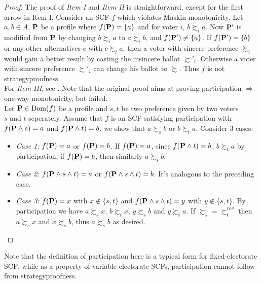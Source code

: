\begin{proof}
    The proof of \textit{Item I} and \textit{Item II} is straightforward, except for the first arrow in Item I. Consider an SCF $f$ which violates Maskin monotonicity. Let $a, b \in A$, $\mathbf{P}$ be a profile where $f(\mathbf{P}) = \{a\}$ and for voter $i$, $b \succsim_i a$. Now $\mathbf{P}'$ is modified from $\mathbf{P}$ by changing $b \succsim_i a$ to $a \succsim_i b$, and $f(\mathbf{P}') \neq \{a\}$. 
    If $f(\mathbf{P}') = \{b\}$ or any other alternatives $c$ with $c \succsim_i a$, then a voter with sincere preference $\succsim_i$ would gain a better result by casting the insincere ballot $\succsim'_i$. Otherwise a voter with sincere preference $\succsim'_i$ can change his ballot to $\succsim$. Thus $f$ is not strategyproofness.\\
    For \textit{Item III}, see \textcite{sanverOnewayMonotonicityForm2009}. Note that the original proof aims at proving participation $\Rightarrow$ one-way monotonicity,  but failed.\\
    Let $\mathbf{P} \in \mathrm{Dom}(f)$ be a profile and $s,t$ be two preference given by two voters $s \mbox{ and } t$ seperately. Assume that $f$ is an SCF satisfying participation with $f(\mathbf{P} \wedge s) = a$ and $f(\mathbf{P} \wedge t) = b$, we show that $a \succsim_s b$ or $b \succsim_t a$. Consider 3 cases:
    \begin{itemize}
        \item \textit{Case 1:} $f(\mathbf{P}) = a$ or $f(\mathbf{P}) = b$. If $f(\mathbf{P}) = a$, since $f(\mathbf{P} \wedge t) = b$, $b \succsim_t a$ by participation; if $f(\mathbf{P}) = b$, then similarly $a \succsim_s b$.
        \item \textit{Case 2:} $f(\mathbf{P} \wedge s \wedge t) = a$ or $f(\mathbf{P} \wedge s \wedge t) = b$. It's analogous to the preceding case.
        \item \textit{Case 3:} $f(\mathbf{P}) = x$ with $x \not \in \{s,t\}$ and $f(\mathbf{P} \wedge s \wedge t) = y$ with $y \not \in \{s,t\}$. By participation we have $a \succsim_s x$, $b \succsim_t x$, $y \succsim_s b$ and $y \succsim_t a$. If $\succsim_s = \succsim^{rev}_t$ then $a \succsim_s x$ and $x \succsim_s b$, thus $a \succsim_s b$ as desired.
    \end{itemize}
\end{proof}

Note that the definition of participation here is a typical form for fixed-electorate SCF, while as a property of variable-electorate SCFs, participation cannot follow from strategyproofness.

